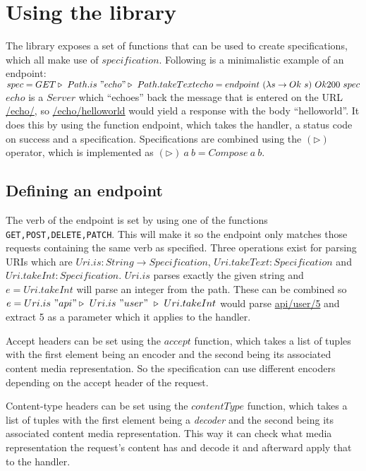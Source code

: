 \section{Using the library}

The library exposes a set of functions that can be used to create
specifications, which all make use of $specification$. Following is a
minimalistic example of an endpoint:\\

\noindent
\begin{math}
spec = GET \triangleright\ Path.is\ "echo" \triangleright\ Path.takeText\\
echo = endpoint\ (\lambda s \rightarrow Ok\ s)\ Ok200\ spec
\end{math}\\

$echo$ is a $Server$ which ``echoes'' back the message that is entered on the
URL \url{/echo/}, so \url{/echo/helloworld} would yield a response with the body
``helloworld''. It does this by using the function endpoint, which takes the
handler, a status code on success and a specification.  Specifications are
combined using the $(\triangleright )$ operator, which is implemented as
$(\triangleright)\ a\ b = Compose\ a\ b$.

\subsection{Defining an endpoint}

The verb of the endpoint is set by using one of the functions
\texttt{GET,POST,DELETE,PATCH}. This will make it so the endpoint only matches
those requests containing the same verb as specified.  Three operations exist
for parsing URIs which are $Uri.is : String \rightarrow Specification$,
$Uri.takeText : Specification$ and $Uri.takeInt: Specification$. $Uri.is$ parses
exactly the given string and $e = Uri.takeInt$ will parse an integer from the
path.  These can be combined so $e = Uri.is\ "api" \triangleright\ Uri.is\
"user"\ \triangleright\ Uri.takeInt$ would parse \url{api/user/5} and extract 5
as a parameter which it applies to the handler.

Accept headers can be set using the $accept$ function, which takes a list of
tuples with the first element being an encoder and the second being its
associated content media representation. So the specification can use different
encoders depending on the accept header of the request.

Content-type headers can be set using the $contentType$ function, which takes a
list of tuples with the first element being a \textit{decoder} and the second
being its associated content media representation. This way it can check what
media representation the request's content has and decode it and afterward apply
that to the handler. 

